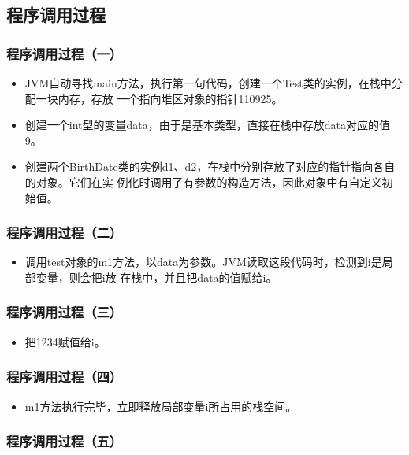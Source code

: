 \subsection{程序调用过程}

\subsubsection{程序调用过程（一）}

\begin{itemize}
\item JVM自动寻找main方法，执行第一句代码，创建一个Test类的实例，在栈中分配一块内存，存放
  一个指向堆区对象的指针110925。
\item 创建一个int型的变量data，由于是基本类型，直接在栈中存放data对应的值9。
\item 创建两个BirthDate类的实例d1、d2，在栈中分别存放了对应的指针指向各自的对象。它们在实
  例化时调用了有参数的构造方法，因此对象中有自定义初始值。
\end{itemize}

\subsubsection{程序调用过程（二）}

\begin{itemize}
\item 调用test对象的m1方法，以data为参数。JVM读取这段代码时，检测到i是局部变量，则会把i放
  在栈中，并且把data的值赋给i。
\end{itemize}

\subsubsection{程序调用过程（三）}

\begin{itemize}
\item 把1234赋值给i。
\end{itemize}

\subsubsection{程序调用过程（四）}

\begin{itemize}
\item m1方法执行完毕，立即释放局部变量i所占用的栈空间。
\end{itemize}

\subsubsection{程序调用过程（五）}

